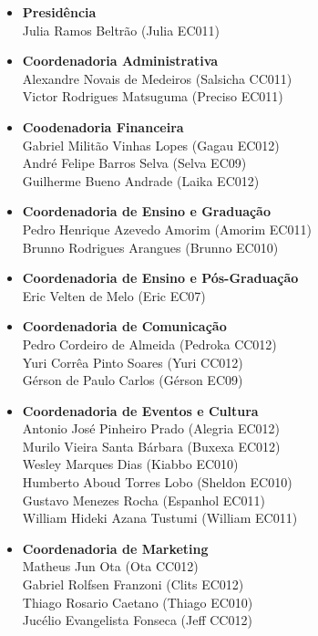 \begin{itemize}
\item   \textbf{Presidência}
		\\Julia Ramos Beltrão (Julia EC011)

\item   \textbf{Coordenadoria Administrativa}
		\\Alexandre Novais de Medeiros (Salsicha CC011)
		\\Victor Rodrigues Matsuguma (Preciso EC011)

\item   \textbf{Coodenadoria Financeira}
		\\Gabriel Militão Vinhas Lopes (Gagau EC012)
		\\André Felipe Barros Selva (Selva EC09)
		\\Guilherme Bueno Andrade (Laika EC012)

\item   \textbf{Coordenadoria de Ensino e Graduação}
		\\Pedro Henrique Azevedo Amorim (Amorim EC011)
		\\Brunno Rodrigues Arangues (Brunno EC010)

\item   \textbf{Coordenadoria de Ensino e Pós-Graduação}
		\\Eric Velten de Melo (Eric EC07)

\item   \textbf{Coordenadoria de Comunicação}
		\\Pedro Cordeiro de Almeida (Pedroka CC012)
		\\Yuri Corrêa Pinto Soares (Yuri CC012)
		\\Gérson de Paulo Carlos (Gérson EC09)

\item   \textbf{Coordenadoria de Eventos e Cultura}
		\\Antonio José Pinheiro Prado (Alegria EC012)
		\\Murilo Vieira Santa Bárbara (Buxexa EC012)
		\\Wesley Marques Dias (Kiabbo EC010)
		\\Humberto Aboud Torres Lobo (Sheldon EC010)
		\\Gustavo Menezes Rocha (Espanhol EC011)
		\\William Hideki Azana Tustumi (William EC011)

\item   \textbf{Coordenadoria de Marketing}
		\\Matheus Jun Ota (Ota CC012)
		\\Gabriel Rolfsen Franzoni (Clits EC012)
		\\Thiago Rosario Caetano (Thiago EC010)
		\\Jucélio Evangelista Fonseca (Jeff CC012)


\end{itemize}
